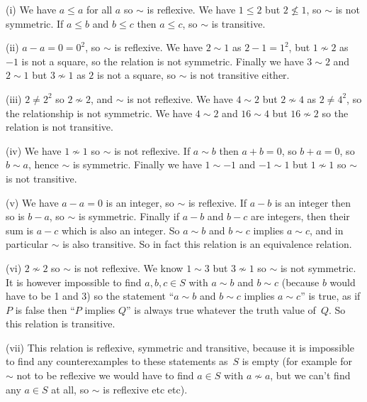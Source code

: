 \documentclass[10pt]{article}
\begin{document}
\medskip{} 

(i) We have $a\leq a$ for all $a$ so $\sim$ is reflexive. We have $1\leq 2$ but $2\not\leq 1$, so $\sim$ is not symmetric. If $a\leq b$ and $b\leq c$ then $a\leq c$, so $\sim$ is transitive.

(ii) $a-a=0=0^2$, so $\sim$ is reflexive. We have $2\sim 1$ as $2-1=1^2$, but $1\not\sim 2$ as $-1$ is not a square, so the relation is not symmetric. Finally we have $3\sim 2$ and $2\sim 1$ but $3\not\sim 1$ as $2$ is not a square, so $\sim$ is not transitive either.

(iii) $2\not=2^2$ so $2\not\sim 2$, and $\sim$ is not reflexive. We have $4\sim 2$ but $2\not\sim 4$ as $2\not=4^2$, so the relationship is not symmetric. We have $4\sim 2$ and $16\sim 4$ but $16\not\sim 2$ so the relation is not transitive.

(iv) We have $1\not\sim 1$ so $\sim$ is not reflexive. If $a\sim b$ then $a+b=0$, so $b+a=0$, so $b\sim a$, hence $\sim$ is symmetric. Finally we have $1\sim-1$ and $-1\sim 1$ but $1\not\sim 1$ so $\sim$ is not transitive.

(v) We have $a-a=0$ is an integer, so $\sim$ is reflexive. If $a-b$ is an integer then so is $b-a$, so $\sim$ is symmetric. Finally if $a-b$ and $b-c$ are integers, then their sum is $a-c$ which is also an integer. So $a\sim b$ and $b\sim c$ implies $a\sim c$, and in particular $\sim$ is also transitive. So in fact this relation is an equivalence relation.

(vi) $2\not\sim 2$ so $\sim$ is not reflexive. We know $1\sim 3$ but $3\not\sim 1$ so $\sim$ is not symmetric. It is however impossible to find $a,b,c\in S$ with $a\sim b$ and $b\sim c$ (because $b$ would have to be 1 and 3) so the statement ``$a\sim b$ and $b\sim c$ implies $a\sim c$'' is true, as if $P$ is false then ``$P$ implies $Q$'' is always true whatever the truth value of~$Q$. So this relation is transitive.

(vii) This relation is reflexive, symmetric and transitive, because it is impossible to find any counterexamples to these statements as~$S$ is empty (for example for $\sim$ not to be reflexive we would have to find $a\in S$ with $a\not\sim a$, but we can't find any $a\in S$ at all, so $\sim$ is reflexive etc etc).
\end{document}
